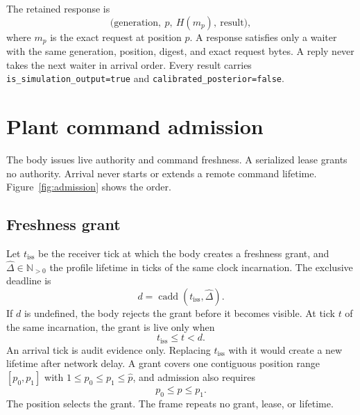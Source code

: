 \documentclass[11pt,a4paper]{article}
\theoremstyle{definition}
\let\NcpTextttBase\texttt
\renewcommand{\texttt}[1]{\mbox{\NcpTextttBase{#1}}}
\newcommand{\cadd}{\operatorname{cadd}}
\newcommand{\Hash}{H}
\begin{document}
The retained response is
\begin{equation}\label{eq:step-response}
\bigl(\mathrm{generation},\ p,\ \Hash(m_p),\ \mathrm{result}\bigr),
\end{equation}
where $m_p$ is the exact request at position $p$. A response satisfies only a waiter
with the same generation, position, digest, and exact request bytes. A reply never
takes the next waiter in arrival order. Every result carries
\texttt{is\_simulation\_output=true} and \texttt{calibrated\_posterior=false}.

\section{Plant command admission}


The body issues live authority and command freshness. A serialized lease grants no
authority. Arrival never starts or extends a remote command lifetime.
Figure~\ref{fig:admission} shows the order.


\subsection{Freshness grant}

Let $t_{\mathrm{iss}}$ be the receiver tick at which the body creates a freshness
grant, and $\hat\Delta\in\mathbb{N}_{>0}$ the profile lifetime in ticks of the same
clock incarnation. The exclusive deadline is
\begin{equation}\label{eq:deadline}
d=\cadd(t_{\mathrm{iss}},\hat\Delta).
\end{equation}
If $d$ is undefined, the body rejects the grant before it becomes visible. At tick $t$
of the same incarnation, the grant is live only when
\begin{equation}\label{eq:live}
t_{\mathrm{iss}}\leq t<d.
\end{equation}
An arrival tick is audit evidence only. Replacing $t_{\mathrm{iss}}$ with it would
create a new lifetime after network delay. A grant covers one contiguous position range
$[p_0,p_1]$ with $1\leq p_0\leq p_1\leq\hat p$, and admission also requires
\begin{equation}\label{eq:grant-range}
p_0\leq p\leq p_1.
\end{equation}
The position selects the grant. The frame repeats no grant, lease, or lifetime.
\end{document}
